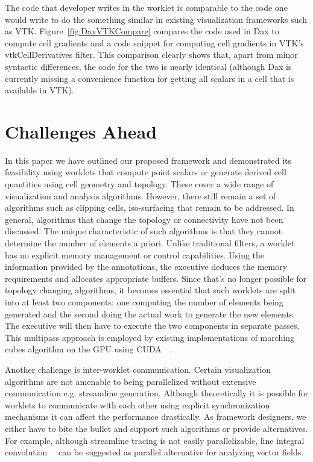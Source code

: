 \documentclass{vgtc}                          %
\newcommand*{\lcite}[1]{~\cite{#1}}
\begin{document}
The code that developer writes in the worklet is comparable to the code
one would write to do the something similar in existing visualization frameworks
such as VTK. Figure~\ref{fig:DaxVTKCompare} compares the code used in Dax
to compute cell gradients and a code snippet for computing cell gradients
in VTK's vtkCellDerivatives filter.  This comparison clearly shows that,
apart from minor syntactic differences, the code for the two is nearly
identical (although Dax is currently missing a convenience function for
getting all scalars in a cell that is available in VTK).

\section{Challenges Ahead}
\label{sec:Challenges}

In this paper we have outlined our proposed framework and demonstrated its
feasibility using worklets that compute point scalars or generate derived cell
quantities using cell geometry and topology. These cover a wide range of
visualization and analysis algorithms. However, there still remain a set of
algorithms such as clipping cells, iso-surfacing that remain to be addressed. In
general, algorithms that change the topology or connectivity have not been
discussed. The unique characteristic of such algorithms is that they cannot
determine the number of elements a priori. Unlike traditional filters, a
worklet has no explicit memory management or control capabilities. Using the
information provided by the annotations, the executive deduces the memory
requirements and allocates appropriate buffers. Since that's no longer possible
for topology changing algorithms, it becomes essential that such worklets are
split into at least two components: one computing the number of elements being
generated and the second doing the actual work to generate the new elements. The
executive will then have to execute the two components in separate passes. This
multipass approach is employed by existing implementations of marching
cubes algorithm on the GPU using CUDA~\lcite{CudaMarchingCubes}.

Another challenge is inter-worklet communication. Certain visualization
algorithms are not amenable to being parallelized without extensive 
communication e.g. streamline generation. Although theoretically it is possible
for worklets to communicate with each other using explicit synchronization
mechanisms it can affect the performance drastically. As framework designers, we
either have to bite the bullet and support such algorithms or provide
alternatives. For example, although streamline tracing is not easily parallelizable,
line integral convolution~\lcite{SurfaceLIC} can be suggested as parallel
alternative for analyzing vector fields.
\end{document}
